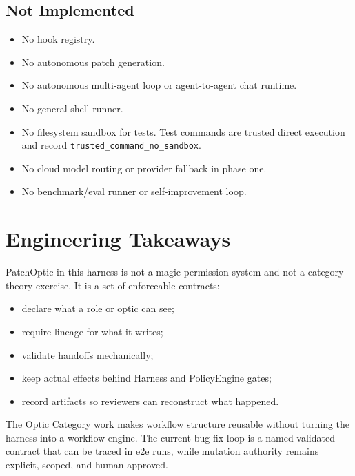 \documentclass[11pt]{article}
\newcommand{\pathcode}[1]{\nolinkurl{#1}}
\begin{document}
\subsection{Not Implemented}

\begin{itemize}
  \item No hook registry.
  \item No autonomous patch generation.
  \item No autonomous multi-agent loop or agent-to-agent chat runtime.
  \item No general shell runner.
  \item No filesystem sandbox for tests. Test commands are trusted direct
  execution and record \pathcode{trusted_command_no_sandbox}.
  \item No cloud model routing or provider fallback in phase one.
  \item No benchmark/eval runner or self-improvement loop.
\end{itemize}

\section{Engineering Takeaways}

PatchOptic in this harness is not a magic permission system and not a category
theory exercise. It is a set of enforceable contracts:

\begin{itemize}
  \item declare what a role or optic can see;
  \item require lineage for what it writes;
  \item validate handoffs mechanically;
  \item keep actual effects behind Harness and PolicyEngine gates;
  \item record artifacts so reviewers can reconstruct what happened.
\end{itemize}

The Optic Category work makes workflow structure reusable without turning the
harness into a workflow engine. The current bug-fix loop is a named validated
contract that can be traced in e2e runs, while mutation authority remains
explicit, scoped, and human-approved.
\end{document}
